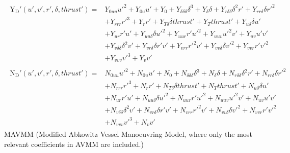 \begin{equation}\label{equation:02.01_VMMs:eqyabkowitz}
\begin{split}\begin{split}
\operatorname{Y_{D}'}{\left(u',v',r',\delta,thrust' \right)} = & Y_{0uu} u'^{2} + Y_{0u} u' + Y_{0} + Y_{\delta\delta\delta} \delta^{3} + Y_{\delta} \delta + Y_{r\delta\delta} \delta^{2} r' + Y_{rr\delta} \delta r'^{2} \\ & + Y_{rrr} r'^{3} + Y_{r} r' + Y_{T\delta} \delta thrust' + Y_{T} thrust' + Y_{u\delta} \delta u' \\ & + Y_{ur} r' u' + Y_{uu\delta} \delta u'^{2} + Y_{uur} r' u'^{2} + Y_{uuv} u'^{2} v' + Y_{uv} u' v' \\ & + Y_{v\delta\delta} \delta^{2} v' + Y_{vr\delta} \delta r' v' + Y_{vrr} r'^{2} v' + Y_{vv\delta} \delta v'^{2} + Y_{vvr} r' v'^{2} \\ & + Y_{vvv} v'^{3} + Y_{v} v' 
\end{split}\end{split}
\end{equation}\begin{equation}\label{equation:02.01_VMMs:eqnabkowitz}
\begin{split}\begin{split}
\operatorname{N_{D}'}{\left(u',v',r',\delta,thrust' \right)} = & N_{0uu} u'^{2} + N_{0u} u' + N_{0} + N_{\delta\delta\delta} \delta^{3} + N_{\delta} \delta + N_{r\delta\delta} \delta^{2} r' + N_{rr\delta} \delta r'^{2} \\ & + N_{rrr} r'^{3} + N_{r} r' + N_{T\delta} \delta thrust' + N_{T} thrust' + N_{u\delta} \delta u' \\ & + N_{ur} r' u' + N_{uu\delta} \delta u'^{2} + N_{uur} r' u'^{2} + N_{uuv} u'^{2} v' + N_{uv} u' v' \\ & + N_{v\delta\delta} \delta^{2} v' + N_{vr\delta} \delta r' v' + N_{vrr} r'^{2} v' + N_{vv\delta} \delta v'^{2} + N_{vvr} r' v'^{2} \\ & + N_{vvv} v'^{3} + N_{v} v' 
\end{split}\end{split}
\end{equation}
\sphinxAtStartPar
MAVMM (Modified Abkowitz Vessel Manoeuvring Model, where only the most relevant coefficients in AVMM are included.)
